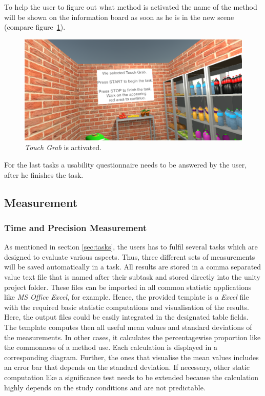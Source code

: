 To help the user to figure out what method is activated the name of the method will be shown on the information board as soon as  he is in the new scene (compare figure~\ref{fig:taskW2}). 

\begin{figure}[H] 
	\center 
	\includegraphics[width=12cm]{Images/TaskWall_2.PNG}
	\caption[\textit{Touch Grab} is activated.]{\textit{Touch Grab} is activated.}
	\label{fig:taskW2}
\end{figure}

For the last tasks a usability questionnaire needs to be answered by the user, after he finishes the task. 


\subsection{Measurement} \label{sec:measurement}

\subsubsection{Time and Precision Measurement}
As mentioned in section \ref{sec:tasks}, the users has to fulfil several tasks which are designed to evaluate various aspects. Thus, three different sets of measurements will be saved automatically in a task. All results are stored in a comma separated value text file that is named after their subtask and stored directly into the unity project folder. These files can be imported in all common statistic applications like \textit{MS Office Excel}, for example. Hence, the provided template is a \textit{Excel} file with the required basic statistic computations and visualisation of the results. Here, the output files could be easily integrated in the designated table fields. The template computes then all useful mean values and standard deviations of the measurements. In other cases, it calculates the percentagewise proportion like the commonness of a method use. Each calculation is displayed in a corresponding diagram. Further, the ones that visualise the mean values includes an error bar that depends on the standard deviation. If necessary, other static computation like a significance test needs to be extended because the calculation highly depends on the study conditions and are not predictable.

